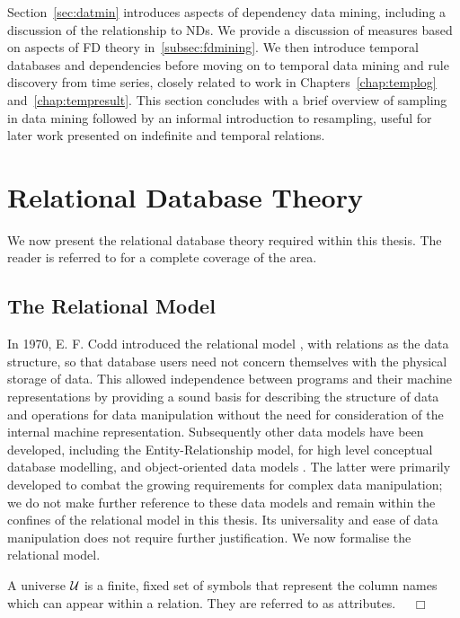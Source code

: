 Section~\ref{sec:datmin} introduces aspects of dependency data mining,
including a discussion of the relationship to NDs. We provide a
discussion of measures based 
on aspects of FD theory in~\ref{subsec:fdmining}. We then introduce
temporal databases and dependencies before moving on to temporal data
mining and rule discovery from time series, closely
related to work in Chapters~\ref{chap:templog} and~\ref{chap:tempresult}.
This section concludes with a brief overview of sampling in data
mining followed by an informal introduction to resampling, useful for
later work presented on indefinite and temporal relations.

\section{Relational Database Theory}\label{sec:relmod}

We now present the relational database theory required within this
thesis. The reader is referred to
\cite{databasefound,atze93,Maier83,Ullm88} for a complete coverage of
the area.

\subsection{The Relational Model}

In 1970, E. F. Codd introduced the relational model \cite{cod70}, with
relations as the data structure,  so
that database users need not concern themselves with the physical
storage of data.  This allowed independence between programs and their
machine representations by providing a sound basis for describing the
structure of data and operations for data manipulation without the
need for consideration of the internal machine
representation. Subsequently other data models have been developed,
including the Entity-Relationship model, for high level conceptual
database modelling, and object-oriented data models
\cite{kim90,databasefound}. The latter were primarily developed to
combat the growing requirements for complex data manipulation; we do
not make further reference to these data models and remain within the
confines of the relational model in this thesis. Its universality and
ease of data 
manipulation does not require further justification. We now formalise the
relational model.

\begin{definition}[Universe]
\begin{rm}
A universe $\cal U$ is a finite, fixed set of symbols that represent the 
column names which can appear within a relation.  They are referred to
as attributes. $\quad\Box$
\end{rm} 
\end{definition}

